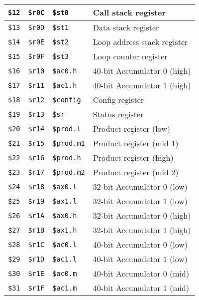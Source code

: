 \documentclass[oneside,english,a4paper,10pt,oneside,openany,final]{memoir}
\newcommand{\Register}[1]{\texttt{#1}}
\begin{document}
\begin{table}[htb]
\begin{tabular}{|l|l|l|l|}
\Register{\$12} & \Register{\$r0C} & \Register{\$st0}     & Call stack register         \\ \hline
\Register{\$13} & \Register{\$r0D} & \Register{\$st1}     & Data stack register         \\ \hline
\Register{\$14} & \Register{\$r0E} & \Register{\$st2}     & Loop address stack register \\ \hline
\Register{\$15} & \Register{\$r0F} & \Register{\$st3}     & Loop counter register       \\ \hline
\Register{\$16} & \Register{\$r10} & \Register{\$ac0.h}   & 40-bit Accumulator 0 (high) \\ \hline
\Register{\$17} & \Register{\$r11} & \Register{\$ac1.h}   & 40-bit Accumulator 1 (high) \\ \hline
\Register{\$18} & \Register{\$r12} & \Register{\$config}  & Config register             \\ \hline
\Register{\$19} & \Register{\$r13} & \Register{\$sr}      & Status register             \\ \hline
\Register{\$20} & \Register{\$r14} & \Register{\$prod.l}  & Product register (low)      \\ \hline
\Register{\$21} & \Register{\$r15} & \Register{\$prod.m1} & Product register (mid 1)    \\ \hline
\Register{\$22} & \Register{\$r16} & \Register{\$prod.h}  & Product register (high)     \\ \hline
\Register{\$23} & \Register{\$r17} & \Register{\$prod.m2} & Product register (mid 2)    \\ \hline
\Register{\$24} & \Register{\$r18} & \Register{\$ax0.l}   & 32-bit Accumulator 0 (low)  \\ \hline
\Register{\$25} & \Register{\$r19} & \Register{\$ax1.l}   & 32-bit Accumulator 1 (low)  \\ \hline
\Register{\$26} & \Register{\$r1A} & \Register{\$ax0.h}   & 32-bit Accumulator 0 (high) \\ \hline
\Register{\$27} & \Register{\$r1B} & \Register{\$ax1.h}   & 32-bit Accumulator 1 (high) \\ \hline
\Register{\$28} & \Register{\$r1C} & \Register{\$ac0.l}   & 40-bit Accumulator 0 (low)  \\ \hline
\Register{\$29} & \Register{\$r1D} & \Register{\$ac1.l}   & 40-bit Accumulator 1 (low)  \\ \hline
\Register{\$30} & \Register{\$r1E} & \Register{\$ac0.m}   & 40-bit Accumulator 0 (mid)  \\ \hline
\Register{\$31} & \Register{\$r1F} & \Register{\$ac1.m}   & 40-bit Accumulator 1 (mid)  \\ \hline
\end{tabular}
\end{table}
\end{document}
